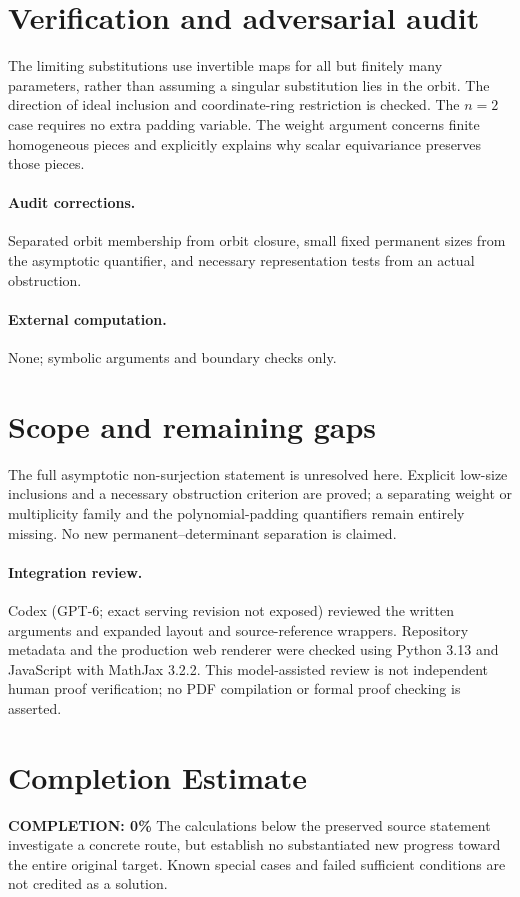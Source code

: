 \documentclass[11pt]{article}
\begin{document}
\section{Verification and adversarial audit}
The limiting substitutions use invertible maps for all but finitely many parameters, rather than assuming a singular substitution lies in the orbit. The direction of ideal inclusion and coordinate-ring restriction is checked. The $n=2$ case requires no extra padding variable. The weight argument concerns finite homogeneous pieces and explicitly explains why scalar equivariance preserves those pieces.
\paragraph{Audit corrections.} Separated orbit membership from orbit closure, small fixed permanent sizes from the asymptotic quantifier, and necessary representation tests from an actual obstruction.
\paragraph{External computation.} None; symbolic arguments and boundary checks only.
\section{Scope and remaining gaps}
The full asymptotic non-surjection statement is unresolved here. Explicit low-size inclusions and a necessary obstruction criterion are proved; a separating weight or multiplicity family and the polynomial-padding quantifiers remain entirely missing. No new permanent--determinant separation is claimed.
\paragraph{Integration review.} Codex (GPT-6; exact serving revision not exposed) reviewed the written arguments and expanded layout and source-reference wrappers. Repository metadata and the production web renderer were checked using Python 3.13 and JavaScript with MathJax 3.2.2. This model-assisted review is not independent human proof verification; no PDF compilation or formal proof checking is asserted.

\section{Completion Estimate}
\noindent\textbf{COMPLETION: 0\%}
The calculations below the preserved source statement investigate a concrete route,
but establish no substantiated new progress toward the entire original target.
Known special cases and failed sufficient conditions are not credited as a solution.
\end{document}
